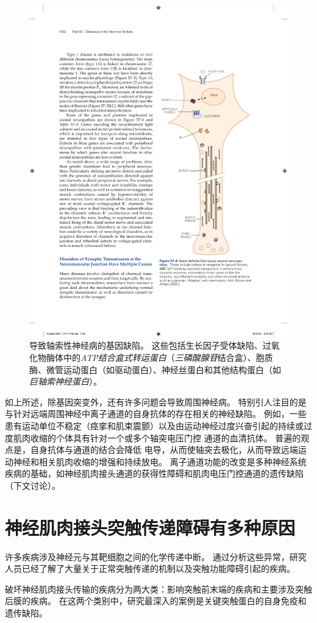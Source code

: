\begin{figure}[htbp]
	\centering
	\includegraphics[width=0.57\linewidth]{chap57/fig_57_6}
	\caption{导致轴索性神经病的基因缺陷。
		这些包括生长因子受体缺陷、过氧化物酶体中的\textit{ATP结合盒式转运蛋白}（\textit{三磷酸腺苷}结合盒）、胞质酶、微管运动蛋白（如驱动蛋白）、神经丝蛋白和其他结构蛋白（如\textit{巨轴索神经蛋白}）\cite{brown2002inherited}。}
	\label{fig:57_6}
\end{figure}


如上所述，除基因突变外，还有许多问题会导致周围神经病。
特别引人注目的是与针对远端周围神经中离子通道的自身抗体的存在相关的神经缺陷。
例如，一些患有运动单位不稳定（痉挛和肌束震颤）以及由运动神经过度兴奋引起的持续或过度肌肉收缩的个体具有针对一个或多个轴突电压门控  通道的血清抗体。
普遍的观点是，自身抗体与通道的结合会降低  电导，从而使轴突去极化，从而导致远端运动神经和相关肌肉收缩的增强和持续放电。
离子通道功能的改变是多种神经系统疾病的基础，如神经肌肉接头通道的获得性障碍和肌肉电压门控通道的遗传缺陷（下文讨论）。



\section{神经肌肉接头突触传递障碍有多种原因}

许多疾病涉及神经元与其靶细胞之间的化学传递中断。
通过分析这些异常，研究人员已经了解了大量关于正常突触传递的机制以及突触功能障碍引起的疾病。


破坏神经肌肉接头传输的疾病分为两大类：影响突触前末端的疾病和主要涉及突触后膜的疾病。
在这两个类别中，研究最深入的案例是关键突触蛋白的自身免疫和遗传缺陷。



